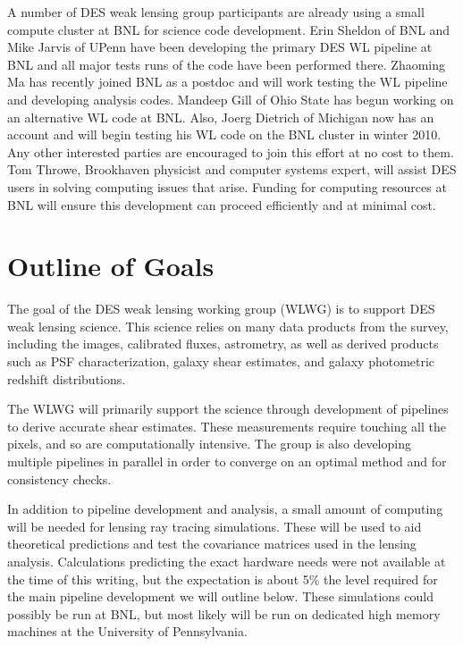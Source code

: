 \documentclass[12pt]{article}
\begin{document}
A number of DES weak lensing group participants are already using a small
compute cluster at BNL for science code development.  Erin Sheldon of BNL and
Mike Jarvis of UPenn have been developing the primary DES WL pipeline at BNL
and all major tests runs of the code have been performed there.  Zhaoming Ma
has recently joined BNL as a postdoc and will work testing the WL pipeline and
developing analysis codes.  Mandeep Gill of Ohio State has begun working on an
alternative WL code at BNL.  Also, Joerg Dietrich of Michigan now has an
account and will begin testing his WL code on the BNL cluster in winter 2010.
Any other interested parties are encouraged to join this effort at no cost to
them.  Tom Throwe, Brookhaven physicist and computer systems expert, will
assist DES users in solving computing issues that arise.  Funding for computing
resources at BNL will ensure this development can proceed efficiently and at
minimal cost.


\section{Outline of Goals}

The goal of the DES weak lensing working group (WLWG) is to support DES weak
lensing science.  This science relies on many data products from the survey,
including the images, calibrated fluxes, astrometry, as well as derived
products such as PSF characterization, galaxy shear estimates, and galaxy
photometric redshift distributions.

The WLWG will primarily support the science through development of pipelines to
derive accurate shear estimates.  These measurements require touching all the
pixels, and so are computationally intensive.  The group is also developing
multiple pipelines in parallel in order to converge on an optimal method and
for consistency checks.  

In addition to pipeline development and analysis, a small amount of computing
will be needed for lensing ray tracing simulations.  These will be used to aid
theoretical predictions and test the covariance matrices used in the lensing
analysis.  Calculations predicting the exact hardware needs were not available
at the time of this writing, but the expectation is about 5\% the level
required for the main pipeline development we will outline below.  These
simulations could possibly be run at BNL, but most likely will be run on
dedicated high memory machines at the University of Pennsylvania.
\end{document}

